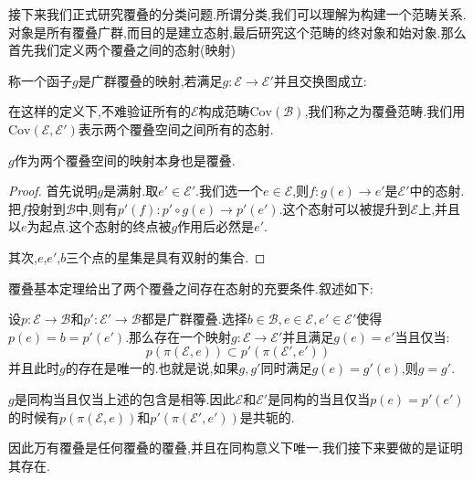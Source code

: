 接下来我们正式研究覆叠的分类问题.所谓分类,我们可以理解为构建一个范畴关系.对象是所有覆叠广群,而目的是建立态射,最后研究这个范畴的终对象和始对象.那么首先我们定义两个覆叠之间的态射(映射)
\begin{definition}
    称一个函子$g$是广群覆叠的映射,若满足$g:\mathcal{E}\to \mathcal{E}'$并且交换图成立:
\end{definition}
在这样的定义下,不难验证所有的$\mathcal{E}$构成范畴$\mathrm{Cov}(\mathcal{B})$,我们称之为覆叠范畴.我们用$\mathrm{Cov}(\mathcal{E},\mathcal{E}')$表示两个覆叠空间之间所有的态射.

\begin{lemma}
    $g$作为两个覆叠空间的映射本身也是覆叠.
\end{lemma}
\begin{proof}
    首先说明$g$是满射.取$e' \in \mathcal{E'}$.我们选一个$e\in \mathcal{E}$,则$f:g(e) \to e'$是$\mathcal{E}'$中的态射.把$f$投射到$\mathcal{B}$中,则有$p'(f):p' \circ g(e) \to p'(e')$.这个态射可以被提升到$\mathcal{E}$上,并且以$e$为起点.这个态射的终点被$g$作用后必然是$e'$.
    
    其次,$e$,$e'$,$b$三个点的星集是具有双射的集合.
\end{proof}
      覆叠基本定理给出了两个覆叠之间存在态射的充要条件.叙述如下:
      
\begin{theorem}
        设$p:\mathcal{E}\to \mathcal{B}$和$p':\mathcal{E}' \to \mathcal{B}$都是广群覆叠.选择$b \in \mathcal{B},e \in \mathcal{E},e'\in \mathcal{E'}$使得$p(e)=b=p'(e')$.那么存在一个映射$g:\mathcal{E}\to \mathcal{E'}$并且满足$g(e)=e'$当且仅当:
        $$
        p(\pi(\mathcal{E},e)) \subset p'(\pi(\mathcal{E'},e')) 
        $$  
        并且此时$g$的存在是唯一的.也就是说,如果$g,g'$同时满足$g(e)=g'(e)$,则$g=g'$.
        
        $g$是同构当且仅当上述的包含是相等.因此$\mathcal{E}$和$\mathcal{E}'$是同构的当且仅当$p(e)=p'(e')$的时候有$p(\pi(\mathcal{E},e))$和$p'(\pi(\mathcal{E}',e'))$是共轭的.
\end{theorem}

因此万有覆叠是任何覆叠的覆叠,并且在同构意义下唯一.我们接下来要做的是证明其存在.

